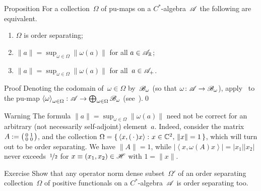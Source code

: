\documentclass[a]{subfiles}
\begin{document}
\begin{parsec}
\begin{point}{Proposition}
For a collection~$\Omega$ of pu-maps on a $C^*$-algebra~$\mathscr{A}$
the following are equivalent.
\begin{enumerate}
\item 
	$\Omega$ is order separating;
\item
	$\|a\|= \sup_{\omega\in\Omega} \left\|\omega(a)\right\|$
	for all $a\in \mathscr{A}_{\mathbb{R}}$;
\item
	$\|a\| = \sup_{\omega\in\Omega} \left\|\omega(a)\right\|$
	for all~$a\in \mathscr{A}_{+}$.
\end{enumerate}
\begin{point}{Proof}%
Denoting the codomain of~$\omega\in\Omega$
by~$\mathscr{B}_\omega$
(so that $\omega\colon \mathscr{A}\to\mathscr{B}_\omega$),
apply~
to the pu-map $\left<\omega\right>_{\omega\in\Omega}\colon 
\mathscr{A}\to\bigoplus_{\omega\in\Omega}
\mathscr{B}_\omega$ (see~).\qed
\end{point}
\begin{point}{Warning}%
The formula
$\|a\|=\sup_{\omega\in\Omega} \|\omega(a)\|$
need not be correct
for an arbitrary (not necessarily self-adjoint)
element~$a$.
Indeed,
consider the matrix $A:=\smash{%
\bigl(\begin{smallmatrix}0&1\\0&0\end{smallmatrix}\bigr)}$,
and the collection $\Omega=\{\,\left<x,(\,\cdot\,)x\right>\colon 
x\in \mathbb{C}^2,\,\|x\|=1\,\}$,
which will turn out to be order separating.
We have $\|A\|=1$,
while $\left| \left<x,\omega(A)x\right>\right|
 =\left|x_1\right|\left|x_2\right|$
 never exceeds~$\nicefrac{1}{2}$
for $x\equiv (x_1,x_2)\in \mathscr{H}$ with $1=\|x\|$.
\end{point}
\end{point}
\begin{point}{Exercise}%
Show that any operator norm dense subset~$\Omega'$
of an order separating collection~$\Omega$
of positive functionals
on a $C^*$-algebra~$\mathscr{A}$
is order separating too.
\end{point}
\end{parsec}
\end{document}
